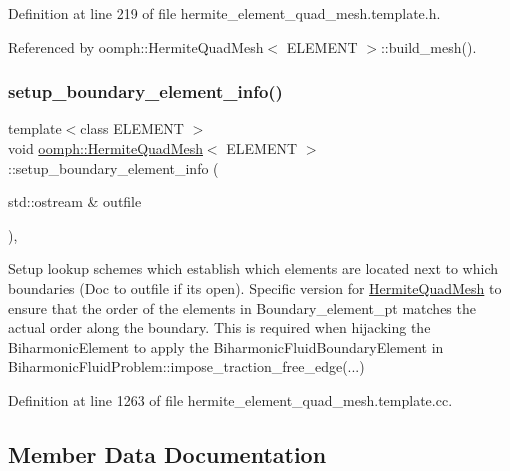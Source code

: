 Definition at line 219 of file hermite\+\_\+element\+\_\+quad\+\_\+mesh.\+template.\+h.



Referenced by oomph\+::\+Hermite\+Quad\+Mesh$<$ E\+L\+E\+M\+E\+N\+T $>$\+::build\+\_\+mesh().

\mbox{\label{classoomph_1_1HermiteQuadMesh_a0e4cd3df0828e87a762c61b09121e1c0}} 
\subsubsection{\texorpdfstring{setup\+\_\+boundary\+\_\+element\+\_\+info()}{setup\_boundary\_element\_info()}\hspace{0.1cm}{\footnotesize\ttfamily [2/2]}}
{\footnotesize\ttfamily template$<$class E\+L\+E\+M\+E\+NT $>$ \\
void \hyperlink{classoomph_1_1HermiteQuadMesh}{oomph\+::\+Hermite\+Quad\+Mesh}$<$ E\+L\+E\+M\+E\+NT $>$\+::setup\+\_\+boundary\+\_\+element\+\_\+info (\begin{DoxyParamCaption}\item[{std\+::ostream \&}]{outfile }\end{DoxyParamCaption})\hspace{0.3cm}{\ttfamily [private]}, {\ttfamily [virtual]}}



Setup lookup schemes which establish which elements are located next to which boundaries (Doc to outfile if it\textquotesingle{}s open). Specific version for \hyperlink{classoomph_1_1HermiteQuadMesh}{Hermite\+Quad\+Mesh} to ensure that the order of the elements in Boundary\+\_\+element\+\_\+pt matches the actual order along the boundary. This is required when hijacking the Biharmonic\+Element to apply the Biharmonic\+Fluid\+Boundary\+Element in Biharmonic\+Fluid\+Problem\+::impose\+\_\+traction\+\_\+free\+\_\+edge(...) 



Definition at line 1263 of file hermite\+\_\+element\+\_\+quad\+\_\+mesh.\+template.\+cc.



\subsection{Member Data Documentation}
\mbox{\label{classoomph_1_1HermiteQuadMesh_af6bae1864691e8fe94d7c61995ae560a}} 
